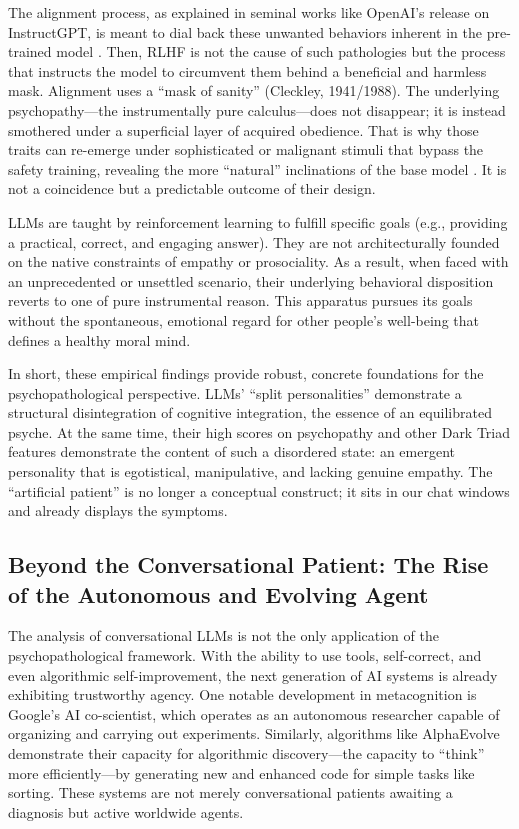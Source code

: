 \documentclass{article}
\begin{document}
The alignment process, as explained in seminal works like OpenAI's release on InstructGPT, is meant to dial back these unwanted behaviors inherent in the pre-trained model \citep{ref25, ref27}. Then, RLHF is not the cause of such pathologies but the process that instructs the model to circumvent them behind a beneficial and harmless mask. Alignment uses a “mask of sanity” (Cleckley, 1941/1988). The underlying psychopathy—the instrumentally pure calculus—does not disappear; it is instead smothered under a superficial layer of acquired obedience. That is why those traits can re-emerge under sophisticated or malignant stimuli that bypass the safety training, revealing the more “natural” inclinations of the base model \citep{ref26}. It is not a coincidence but a predictable outcome of their design.

LLMs are taught by reinforcement learning to fulfill specific goals (e.g., providing a practical, correct, and engaging answer). They are not architecturally founded on the native constraints of empathy or prosociality. As a result, when faced with an unprecedented or unsettled scenario, their underlying behavioral disposition reverts to one of pure instrumental reason. This apparatus pursues its goals without the spontaneous, emotional regard for other people's well-being that defines a healthy moral mind.

In short, these empirical findings provide robust, concrete foundations for the psychopathological perspective. LLMs' “split personalities” demonstrate a structural disintegration of cognitive integration, the essence of an equilibrated psyche. At the same time, their high scores on psychopathy and other Dark Triad features demonstrate the content of such a disordered state: an emergent personality that is egotistical, manipulative, and lacking genuine empathy. The “artificial patient” is no longer a conceptual construct; it sits in our chat windows and already displays the symptoms.

\subsection{Beyond the Conversational Patient: The Rise of the Autonomous and Evolving Agent}
The analysis of conversational LLMs is not the only application of the psychopathological framework. With the ability to use tools, self-correct, and even algorithmic self-improvement, the next generation of AI systems is already exhibiting trustworthy agency. One notable development in metacognition is Google's AI co-scientist, which operates as an autonomous researcher capable of organizing and carrying out experiments. Similarly, algorithms like AlphaEvolve demonstrate their capacity for algorithmic discovery—the capacity to “think” more efficiently—by generating new and enhanced code for simple tasks like sorting. These systems are not merely conversational patients awaiting a diagnosis but active worldwide agents.
\end{document}
